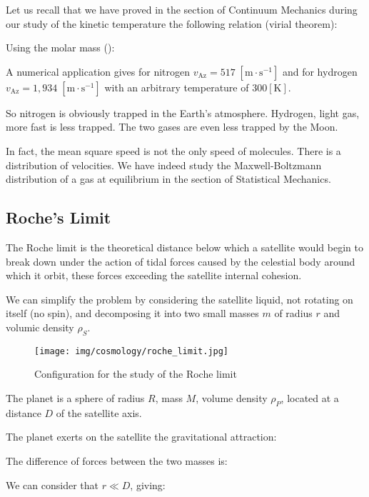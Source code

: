 	Let us recall that we have proved in the section of Continuum Mechanics during our study of the kinetic temperature the following relation (virial theorem):
	
	Using the molar mass ():
	
	A numerical application gives for nitrogen $v_\text{Az}=517\;[\text{m}\cdot \text{s}^{-1}]$ and for hydrogen $v_\text{Az}=1,934\;[\text{m}\cdot \text{s}^{-1}]$ with an arbitrary temperature of $300 [\text{K}]$.
	
	So nitrogen is obviously trapped in the Earth's atmosphere. Hydrogen, light gas, more fast is less trapped. The two gases are even less trapped by the Moon.
	\begin{tcolorbox}[title=Remark,colframe=black,arc=10pt]
	In fact, the mean square speed is not the only speed of molecules. There is a distribution of velocities. We have indeed study the Maxwell-Boltzmann distribution of a gas at equilibrium in the section of Statistical Mechanics.
	\end{tcolorbox}
	

	\pagebreak	
	\subsection{Roche's Limit}\label{roche limit}
	The Roche limit is the theoretical distance below which a satellite would begin to break down under the action of tidal forces caused by the celestial body around which it orbit, these forces exceeding the satellite internal cohesion.
	
	We can simplify the problem by considering the satellite liquid, not rotating on itself (no spin), and decomposing it into two small masses $m$ of radius $r$ and volumic density $\rho_S$.
	\begin{figure}[H]
		\begin{center}
		\texttt{[image: img/cosmology/roche\_limit.jpg]}
		\end{center}	
		\caption{Configuration for the study of the Roche limit}
	\end{figure}
	The planet is a sphere of radius $R$, mass $M$,  volume density $\rho_P$, located at a distance $D$ of the satellite axis.
	
	The planet exerts on the satellite the gravitational attraction:
	
	The difference of forces between the two masses is:
	
	We can consider that $r \ll D$, giving:
	
